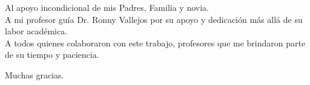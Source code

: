 
\def\baselinestretch{1.0}
Al apoyo incondicional de mis Padres, Familia y novia.
\\
A mi profesor gu\'ia Dr. Ronny Vallejos
 por su apoyo y dedicaci\'on m\'as all\'a de su
labor acad\'emica.\\
A todos quienes colaboraron con este trabajo, profesores que me
brindaron parte de su tiempo y paciencia.
\\

\begin{center}
Muchas gracias.
\end{center} 